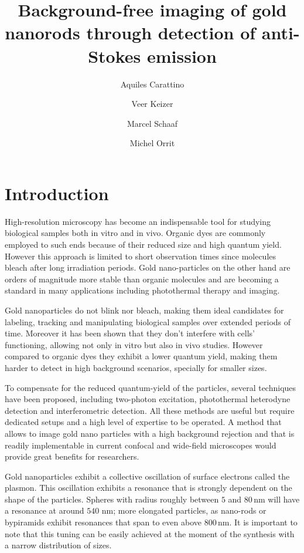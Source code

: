 \documentclass[journal=nalefd,manuscript=letter]{achemso}
\author{Aquiles Carattino}
\affiliation[Leiden]
{Huygens-Kamerlingh Onnes, Leiden, The Netherlands}
\author{Veer Keizer}
\affiliation[Leiden]
{Huygens-Kamerlingh Onnes, Leiden, The Netherlands}
\author{Marcel Schaaf}
\affiliation[Leiden]
{Huygens-Kamerlingh Onnes, Leiden, The Netherlands}
\author{Michel Orrit}
\affiliation[Leiden]
{Huygens-Kamerlingh Onnes, Leiden, The Netherlands}
\title{Background-free imaging of gold nanorods through detection of
anti-Stokes emission}
\newcommand{\nm}{\ensuremath{\,\textrm{nm}}}
\begin{document}
\maketitle
{}
\section{Introduction}
High-resolution microscopy has become an indispensable tool for studying
biological samples both in vitro and in vivo\cite{Moerner2007}. Organic dyes are
commonly employed to such ends because of their reduced size and high quantum
yield. However this approach is limited to short observation times since
molecules bleach after long irradiation periods. Gold nano-particles on the
other hand are orders of magnitude more stable than organic molecules and are
becoming a standard in many applications including photothermal therapy and
imaging.

Gold nanoparticles do not blink nor bleach, making them ideal candidates for
labeling, tracking and manipulating biological samples over extended periods of
time. Moreover it has been shown that they don't interfere with cells'
functioning, allowing not only in vitro but also in vivo studies. However
compared to organic dyes they exhibit a lower quantum yield, making them
harder to detect in high background scenarios, specially for smaller sizes.

To compensate for the reduced quantum-yield of the particles, several techniques
have been proposed, including two-photon excitation\cite{VandenBroek2013},
photothermal heterodyne detection\cite{Berciaud2006} and interferometric
detection\cite{Ignatovich2006}. All these methods are useful but require
dedicated setups and a high level of expertise to be operated. A method that
allows to image gold nano particles with a high background rejection and that is
readily implementable in current confocal and wide-field microscopes would
provide great benefits for researchers.

Gold nanoparticles exhibit a collective oscillation of surface electrons called
the plasmon. This oscillation exhibits a resonance that is strongly dependent on
the shape of the particles. Spheres with radius roughly between $5$ and $80\nm$
will have a resonance at around $540\,\nm$; more elongated particles, as
nano-rods or bypiramids exhibit resonances that span to even above $800\nm$.
It is important to note that this tuning can be easily achieved at the moment of
the synthesis with a narrow distribution of sizes.
\end{document}

